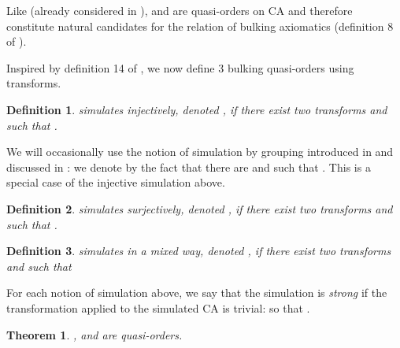 \documentclass[a4paper]{elsarticle}
\def\qed{\relax\ifmmode\hskip2em \blacksquare\else\unskip\nobreak\hfill\hskip1em \fi}
\newtheorem{defn}{Definition}[section]
\newtheorem{thm}{Theorem}[section]
\begin{document}
Like  (already considered in \cite{bulking1}),  and
 are quasi-orders on CA and therefore constitute natural
candidates for the  relation of bulking axiomatics (definition
8 of \cite{bulking1}).

Inspired by definition 14 of \cite{bulking1}, we now define 3 bulking
quasi-orders using  transforms.  

\begin{defn}
   simulates  \emph{injectively}, denoted
  , if there exist two  transforms
   and  such that
  .
\end{defn}

We will occasionally use the notion of simulation by grouping
introduced in \cite{Mazoyer:1999:IOC} and discussed in
\cite{bulking1}: we denote by  the fact that
there are  and  such that
. This is a special case of the
injective simulation above.

\begin{defn}
   simulates  \emph{surjectively}, denoted
  , if there exist two  transforms
   and  such that
  .
\end{defn}

\begin{defn}
   simulates  in a mixed way, denoted
  , if there exist two  transforms
   and  such that
  
\end{defn}

For each notion of simulation above, we say that the simulation is
\emph{strong} if the transformation  applied to the simulated
CA is trivial:  so that
.

\begin{thm}
  ,  and
   are quasi-orders.
\end{thm}
\end{document}
